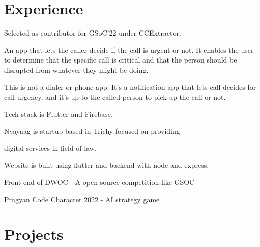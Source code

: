 \documentclass[]{deedy-resume-openfont}
\begin{document}
\hfill
\begin{minipage}[t]{0.69\textwidth} 

%
%
\section{Experience}
\hfill {}
\begin{tightemize}
    \item Selected as contributor for GSoC'22 under CCExtractor.
    \item An app that lets the caller decide if the call is urgent or not. It enables the user to determine that the specific call is critical and that the person should be disrupted from whatever they might be doing.
    \item This is not a dialer or phone app. It's a notification app that lets call decides for call urgency, and it's up to the called person to pick up the call or not.
	\item Tech stack is Flutter and Firebase.
\end{tightemize}
\hfill {}
\begin{tightemize}
    \item Nyayaag is startup based in Trichy focused on providing 
    
    digital services in field of law.
	\item Website is built using flutter and backend with node and express.
\end{tightemize}
\hfill {}
\begin{tightemize}
	\item Front end of DWOC - A open source competition like GSOC
	\item Pragyan Code Character 2022 - AI strategy game
\end{tightemize}
\sectionsep
%
%
\section{Projects}
\raggedright


\end{minipage}
\end{document}
